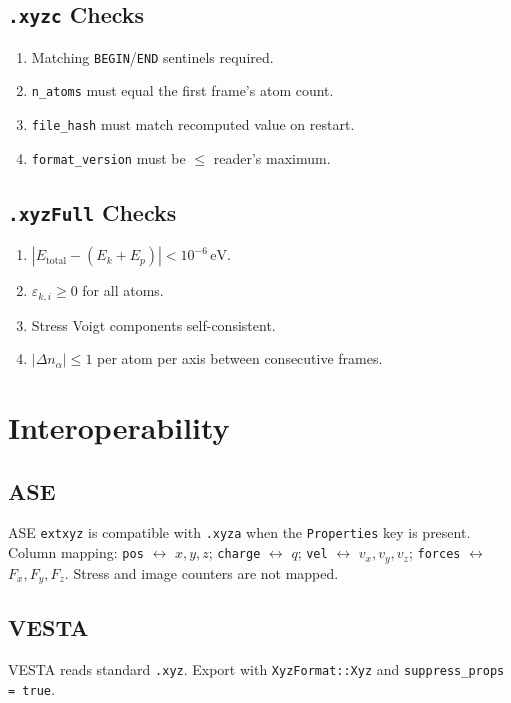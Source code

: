 \documentclass[11pt, a4paper, oneside]{article}
\newcommand{\eV}{\text{eV}}
\begin{document}
\subsection{\texttt{.xyzc} Checks}
\begin{enumerate}
  \item Matching \texttt{BEGIN}/\texttt{END} sentinels required.
  \item \texttt{n\_atoms} must equal the first frame's atom count.
  \item \texttt{file\_hash} must match recomputed value on restart.
  \item \texttt{format\_version} must be $\leq$ reader's maximum.
\end{enumerate}

\subsection{\texttt{.xyzFull} Checks}
\begin{enumerate}
  \item $|E_{\mathrm{total}} - (E_k + E_p)| < 10^{-6}\,\eV$.
  \item $\varepsilon_{k,i} \geq 0$ for all atoms.
  \item Stress Voigt components self-consistent.
  \item $|\Delta n_\alpha| \leq 1$ per atom per axis between consecutive frames.
\end{enumerate}

\section{Interoperability}
\label{sec:interop}

\subsection{ASE}
ASE \texttt{extxyz} is compatible with \texttt{.xyza} when the
\texttt{Properties} key is present. Column mapping:
\texttt{pos} $\leftrightarrow$ $x,y,z$;
\texttt{charge} $\leftrightarrow$ $q$;
\texttt{vel} $\leftrightarrow$ $v_x,v_y,v_z$;
\texttt{forces} $\leftrightarrow$ $F_x,F_y,F_z$.
Stress and image counters are not mapped.

\subsection{VESTA}
VESTA reads standard \texttt{.xyz}. Export with
\texttt{XyzFormat::Xyz} and \texttt{suppress\_props = true}.
\end{document}
